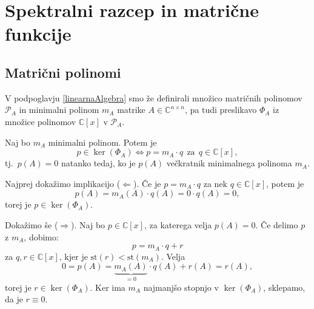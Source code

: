 \documentclass[mat1]{fmfdelo}
\newcommand{\C}{\mathbb C}
\begin{document}
\section{Spektralni razcep in matrične funkcije}
\subsection{Matrični polinomi}
V podpoglavju \ref{linearnaAlgebra} smo že definirali množico matričnih polinomov $\mathcal{P}_A$ in minimalni polinom $m_A$ matrike $A \in \C^{n \times n}$, pa tudi preslikavo $\Phi_A$ iz množice polinomov $\C [x]$ v $\mathcal{P}_A$.
\begin{trditev}\label{trditevMinimalniPolinom}
    Naj bo $m_A$ minimalni polinom. Potem je
    \begin{equation*}
        p \in \ker \left(\Phi_A\right) \Leftrightarrow p = m_A \cdot q\ \  \text{za}\ \ q \in \C [x],
    \end{equation*}
    tj.\ $p(A) = 0$ natanko tedaj, ko je $p(A)$ večkratnik minimalnega polinoma $m_A$.
\end{trditev}
\begin{dokaz}
    Najprej dokažimo implikacijo ($\Leftarrow$). Če je $p = m_A\cdot q$ za nek $q \in \C [x]$, potem je
    \begin{equation*}
        p(A) = m_A(A) \cdot q(A) = 0 \cdot q(A) = 0,
    \end{equation*}
    torej je $p \in \ker\left(\Phi_A\right)$.
    
    Dokažimo še ($\Rightarrow$). Naj bo $p \in \C [x]$, za katerega velja $p(A) = 0$. Če delimo $p$ z $m_A$, dobimo:
    \begin{equation*}
        p = m_A \cdot q + r
    \end{equation*}
    za $q, r \in \C [x]$, kjer je $\text{st}(r) < \text{st}\left(m_A\right)$. Velja
    \begin{equation*}
        0 = p(A) = \underbrace{m_A(A)}_{=0} \cdot q(A) + r(A) = r(A),
    \end{equation*}
    torej je $r \in \ker\left(\Phi_A\right)$. Ker ima $m_A$ najmanjšo stopnjo v $\ker\left(\Phi_A\right)$, sklepamo, da je $r \equiv 0$.
\end{dokaz}
\end{document}
